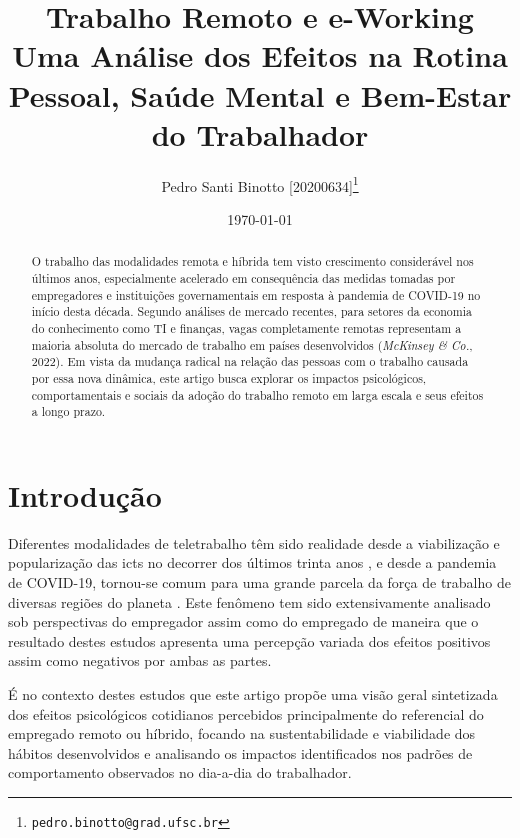 \documentclass[12pt]{article}
\title{%
   Trabalho Remoto e e-Working\\
   \large Uma Análise dos Efeitos na Rotina Pessoal, Saúde Mental e Bem-Estar do Trabalhador }
\author[1]{Pedro Santi Binotto [20200634]\thanks{\texttt{pedro.binotto@grad.ufsc.br}}}
\date{\today}
\affil[1]{Departamento de Informática e Estatística, Universidade Federal de Santa Catarina}
\begin{document}
\begin{titlepage}
\maketitle
\thispagestyle{empty}

\begin{abstract} \noindent
  O trabalho das modalidades remota e híbrida tem visto crescimento considerável nos últimos anos, 
  especialmente acelerado em consequência das medidas tomadas por empregadores e instituições governamentais em resposta
  à pandemia de COVID-19 no início desta década. Segundo análises de mercado recentes, para setores da economia do
  conhecimento como TI e finanças, vagas completamente remotas representam a maioria absoluta
  do mercado de trabalho em países desenvolvidos (\textit{McKinsey \& Co.}, 2022). Em vista da mudança radical na %
  relação das pessoas com o trabalho causada por essa nova dinâmica, este artigo busca explorar os impactos psicológicos,
  comportamentais e sociais da adoção do trabalho remoto em larga escala e seus efeitos a longo prazo.
\end{abstract}

\end{titlepage}

\newpage
\tableofcontents

\newpage
\printglossary[title=Glossário, toctitle=Glossário]

\newpage
\section{Introdução}

Diferentes modalidades de \gls{teletrabalho} têm sido realidade desde a viabilização e popularização das \gls{ict}s
\cite{diMartino1990} no decorrer dos últimos trinta anos \cite{jit2012}, e desde a pandemia de COVID-19, tornou-se comum
para uma grande parcela da força de trabalho de diversas regiões do planeta \cite{apolloTechnical2024}. Este fenômeno tem sido
extensivamente analisado sob perspectivas do empregador \cite{hofschulteBeck2022,sustainability2022} assim como do
empregado \cite{ijerph2021,ntwe2017} de maneira que o resultado destes estudos apresenta uma percepção variada dos
efeitos positivos assim como negativos por ambas as partes.

É no contexto destes estudos que este artigo propõe uma visão geral sintetizada dos efeitos psicológicos cotidianos percebidos
principalmente do referencial do empregado remoto ou híbrido, focando na sustentabilidade e viabilidade dos hábitos
desenvolvidos e analisando os impactos identificados nos padrões de comportamento observados no dia-a-dia do
trabalhador.
\end{document}
